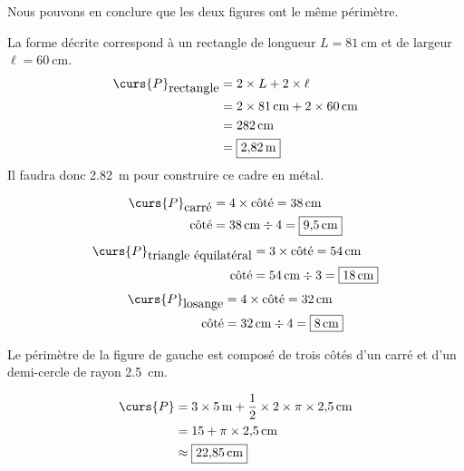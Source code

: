 \documentclass[../Cours.tex]{subfiles}
\begin{document}
\begin{questions}
    Nous pouvons en conclure que les deux figures ont le même périmètre.

    \exercice 
    La forme décrite correspond à un rectangle de longueur $L = \qty{81}{\centi\metre}$ et de largeur $\ell = \qty{60}{\centi\metre}$.
    \begin{align*}
        \curs{P}_{\mbox{rectangle}} &= 2 \times L + 2 \times \ell \\
        &= 2 \times \qty{81}{\centi\metre} + 2 \times \qty{60}{\centi\metre} \\ 
        &= \qty{282}{\centi\metre} \\
        &= \boxed{\qty{2.82}{\metre}}
    \end{align*}
    Il faudra donc \qty{2.82}{\metre} pour construire ce cadre en métal.

    \exercice 
    \question 
    \begin{align*}
        \curs{P}_{\mbox{carré}} &= 4 \times \mbox{côté} = \qty{38}{\centi\metre} \\
        \mbox{côté} &= \qty{38}{\centi\metre} \div 4 = \boxed{\qty{9.5}{\centi\metre}}
    \end{align*}
    \question 
    \begin{align*}
        \curs{P}_{\mbox{triangle équilatéral}} &= 3 \times \mbox{côté} = \qty{54}{\centi\metre} \\
        \mbox{côté} &= \qty{54}{\centi\metre} \div 3 = \boxed{\qty{18}{\centi\metre}}
    \end{align*}
    \question 
    \begin{align*}
        \curs{P}_{\mbox{losange}} &= 4 \times \mbox{côté} = \qty{32}{\centi\metre} \\
        \mbox{côté} &= \qty{32}{\centi\metre} \div 4 = \boxed{\qty{8}{\centi\metre}}
    \end{align*}

    \exercice Le périmètre de la figure de gauche est composé de trois côtés d'un carré et d'un demi-cercle de rayon \qty{2.5}{\centi\metre}.

    \begin{center}
        \begin{align*}
            \curs{P} &= 3 \times \qty{5}{\metre} + \frac{1}{2} \times 2 \times \pi \times \qty{2.5}{\centi\metre} \\
            &= 15 + \pi \times \qty{2.5}{\centi\metre} \\
            &\approx \boxed{\qty{22.85}{\centi\metre}}
        \end{align*}
    \end{center}


\end{questions}
\end{document}

